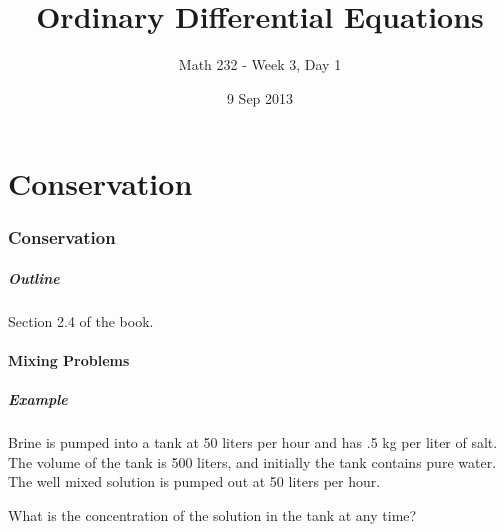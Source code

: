 \part{Conservation}
\section{Conservation}

\title{Ordinary Differential Equations}
\subtitle{Math 232 - Week 3, Day 1}
\date{9 Sep 2013}

\begin{frame}
  \titlepage
\end{frame}

\begin{frame}
  \frametitle{Outline}
  \tableofcontents[hideothersubsections]

  Section 2.4 of the book.
\end{frame}


\subsection{Mixing Problems}


\begin{frame}
  \frametitle{Example}

  {\color{red}Brine is pumped into a tank at 50 liters per hour and has .5 kg per
  liter of salt.} {\color{blue}The volume of the tank is 500 liters, and initially
  the tank contains pure water.} {\color{purple}The well mixed solution is pumped out
  at 50 liters per hour.}

  What is the concentration of the solution in the tank at any time?

\end{frame}


